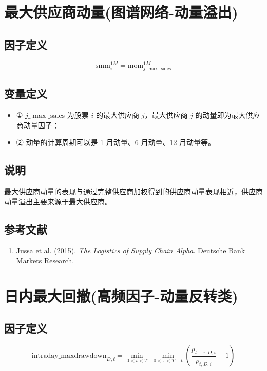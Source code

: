 \documentclass{article}
\begin{document}
\section{最大供应商动量(图谱网络-动量溢出)}

\subsection{因子定义}
\begin{equation}
    \mathrm{smm}_i^{1M} = \mathrm{mom}_{j\_{\max\_\mathrm{sales}}}^{1M}
\end{equation}

\subsection{变量定义}
\begin{itemize}
    \item ① \( j\_{\max\_\mathrm{sales}} \) 为股票 \( i \) 的最大供应商 \( j \)，最大供应商 \( j \) 的动量即为最大供应商动量因子；
    \item ② 动量的计算周期可以是 1 月动量、6 月动量、12 月动量等。
\end{itemize}

\subsection{说明}
最大供应商动量的表现与通过完整供应商加权得到的供应商动量表现相近，供应商动量溢出主要来源于最大供应商。

\subsection{参考文献}
\begin{enumerate}
    \item Jussa et al. (2015). \textit{The Logistics of Supply Chain Alpha}. Deutsche Bank Markets Research.
\end{enumerate}

\section{日内最大回撤(高频因子-动量反转类)}

\subsection{因子定义}
\begin{equation}
    \mathrm{intraday\_maxdrawdown}_{D,i} = \min_{0 < t < T} \; \min_{0 < \tau < T - t} \left( \frac{p_{t+\tau,D,i}}{p_{t,D,i}} - 1 \right)
\end{equation}
\end{document}
